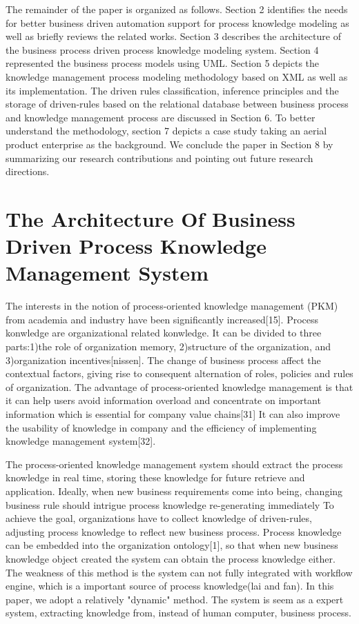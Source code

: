 \documentclass[doublespacing]{elsarticle}
\begin{document}
The remainder of the paper is organized as follows. Section 2
identifies the needs for better
business driven automation support for  process knowledge
modeling as well as briefly reviews the related works. Section 3
describes the architecture of the business process driven process knowledge modeling system. Section 4 represented the business
process models using UML. Section 5 depicts the knowledge management
process modeling methodology based on XML as well as its
implementation. The driven rules classification, inference principles
and the storage of driven-rules based on the
relational database between
business process and knowledge management process are discussed in
Section 6. To better understand the methodology, section 7 depicts a
case study taking an aerial product enterprise as the background. We
conclude the paper in Section 8 by summarizing our research
contributions and pointing out future research directions.



\section{ The Architecture Of Business  Driven Process Knowledge
    Management System}
\label{sec:backgr-liter}
The interests in the notion of process-oriented knowledge management
(PKM) from academia and industry have been significantly
increased[15]. Process konwledge are organizational related konwledge. It can be
divided to three parts:1)the role of organization memory, 2)structure
of the organization, and 3)organization incentives[nissen]. The change
of  business
process affect the  contextual factors, giving rise to consequent
alternation of roles, policies and rules of organization.
 The advantage of process-oriented
knowledge management is that it can help users avoid information
overload and concentrate on important information which is essential
for company value chains[31] It can also improve the usability of
knowledge in company and the efficiency of implementing knowledge
management system[32]. 



The process-oriented knowledge management system should extract the
process knowledge  in real time, storing these knowledge for future
retrieve and application. 
 Ideally, when new
business requirements come into being, changing business rule should
intrigue process knowledge re-generating immediately  To achieve the goal, organizations have to
collect knowledge of driven-rules, adjusting process knowledge  to
reflect new business process. Process knowledge can be embedded into
the organization ontology[1], so that when new business knowledge object created
the system can  obtain the process knowledge either. The weakness of
this method is the system can not fully integrated with workflow
engine, which is a important source of process knowledge(lai and
fan). In this paper, we adopt a
relatively "dynamic" method. The system is seem as a expert system,
extracting knowledge from, instead of human computer, business process.  
\end{document}
